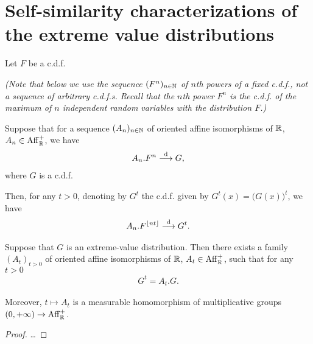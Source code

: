 \section{Self-similarity characterizations of the extreme value distributions}

\begin{lemma}
  \label{lem:continuous-parameter-ev-limit}
  Let $F$ be a c.d.f.

  \emph{(Note that below we use
  the sequence $(F^n)_{n \in \mathbb{N}}$ of $n$th powers of a fixed c.d.f.,
  not a sequence of arbitrary c.d.f.s.
  Recall that the $n$th power $F^n$ is the c.d.f. of the maximum
  of $n$ independent random variables with the distribution $F$.)}

  Suppose that for a sequence $(A_n)_{n \in \mathbb{N}}$ of oriented
  affine isomorphisms of $\mathbb{R}$, $A_n \in \mathrm{Aff}^+_{\mathbb{R}}$, we have
  \begin{align*}
    A_n.F^n \overset{\mathrm{d}}{\longrightarrow} G ,
  \end{align*}
  where $G$ is a c.d.f.

  Then, for any $t > 0$, denoting by $G^t$ the c.d.f. given by
  $G^t(x) = \big( G(x) \big)^t$, we have
  \begin{align*}
    A_{n}.F^{\lfloor n t \rfloor} \overset{\mathrm{d}}{\longrightarrow} G^t .
  \end{align*}
\end{lemma}

\begin{lemma}
  \label{lem:self-similarity-of-extreme-value-distributions}
  \leanok
  Suppose that $G$ is an extreme-value distribution.
  Then there exists a family $(A_t)_{t > 0}$ of
  oriented affine isomorphisms of $\mathbb{R}$, $A_t \in \mathrm{Aff}^+_{\mathbb{R}}$,
  such that for any $t > 0$
  \begin{align*}
    G^t = A_t . G .
  \end{align*}

  Moreover, $t \mapsto A_t$ is a measurable homomorphism
  of multiplicative groups $(0,+\infty) \to \mathrm{Aff}^+_{\mathbb{R}}$.
\end{lemma}
\begin{proof}
  \ldots
\end{proof}

